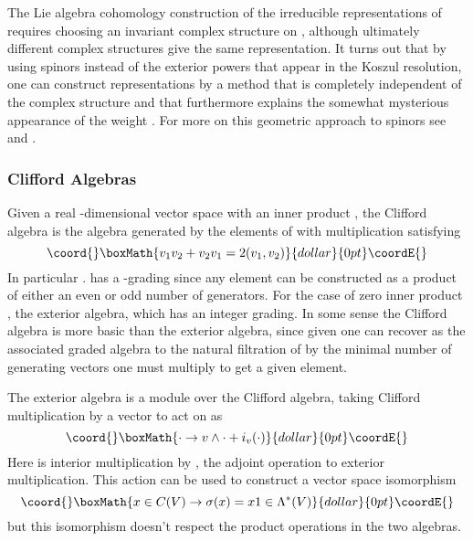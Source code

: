 \documentclass[a4paper,a4paper]{article}
\theoremstyle{conjecture}
\begin{document}
The Lie algebra cohomology construction of the irreducible
representations of \coordHE{} requires choosing an invariant complex
structure on \coordHE{}, although ultimately
different complex structures give the same representation. It
turns out that by using spinors instead of the exterior powers
that appear in the Koszul resolution, one can construct
representations by a method that is completely independent of the
complex structure and that furthermore explains the somewhat
mysterious appearance of the weight \myHighlight{$\delta$}\coordHE{}. For more on this 
geometric approach to spinors see \cite{Chevalley} and
\cite{PS}.

\subsubsection{Clifford Algebras}

Given a real \coordHE{}-dimensional vector space \coordHE{} with an inner product \myHighlight{$(\cdot,\cdot)$}\coordHE{}, the Clifford
algebra \coordHE{} is the algebra generated by the elements of \coordHE{} with multiplication
satisfying
$$\coord{}\boxMath{v_1v_2+v_2v_1=2(v_1,v_2)}{dollar}{0pt}\coordE{}$$
In particular \coordHE{}.  \coordHE{} has a \coordHE{}-grading since any element can be constructed as a product of
either an even or odd number of generators. For the case of zero
inner product \coordHE{}, the exterior algebra, which has
an integer grading.  In some sense the Clifford algebra is more
basic than the exterior algebra, since given \coordHE{} one can
recover \coordHE{} as the associated graded algebra to the
natural filtration of \coordHE{} by the minimal number of generating
vectors one must multiply to get a given element.

The exterior algebra \coordHE{} is a module over the Clifford algebra, taking
Clifford multiplication by a vector \coordHE{}
to act on \coordHE{} as
$$\coord{}\boxMath{\cdot \rightarrow v\wedge\cdot + i_v(\cdot)}{dollar}{0pt}\coordE{}$$
Here \coordHE{} is interior multiplication by \coordHE{},
the adjoint operation to exterior multiplication.  This action can be used to construct
a vector space isomorphism \myHighlight{$\sigma$}\coordHE{}  $$\coord{}\boxMath{x\in C(V)\rightarrow \sigma(x)=x1\in\Lambda^*(V)}{dollar}{0pt}\coordE{}$$
but this isomorphism doesn't respect the product operations in the two algebras.
\end{document}
